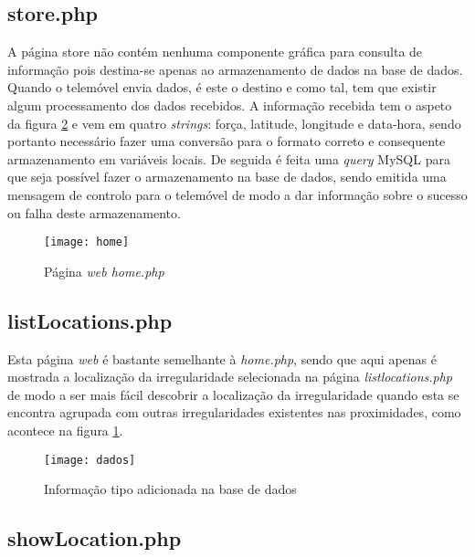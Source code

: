 \subsection{store.php}
\label{sub:store.php}

A página store não contém nenhuma componente gráfica para consulta de informação pois destina-se apenas ao armazenamento de dados na base de dados.
Quando o telemóvel envia dados, é este o destino e como tal, tem que existir algum processamento dos dados recebidos.
A informação recebida tem o aspeto da figura \ref{fig:informacao_tipo_adicionada_na_base_de_dados} e vem em quatro \emph{strings}: força, latitude, longitude e data-hora, sendo portanto necessário fazer uma conversão para o formato correto e consequente armazenamento em variáveis locais.
De seguida é feita uma \emph{query} MySQL para que seja possível fazer o armazenamento na base de dados, sendo emitida uma mensagem de controlo para o telemóvel de modo a dar informação sobre o sucesso ou falha deste armazenamento.

\begin{figure}[htp]
	\centering
	\texttt{[image: home]}
	\caption{Página \emph{web home.php}}
	\label{fig:home.php}
\end{figure}

\subsection{listLocations.php}
\label{sub:listlocations.php}

Esta página \emph{web} é bastante semelhante à \emph{home.php}, sendo que aqui apenas é mostrada a localização da irregularidade selecionada na página \emph{listlocations.php} de modo a ser mais fácil descobrir a localização da irregularidade quando esta se encontra agrupada com outras irregularidades existentes nas proximidades, como acontece na figura \ref{fig:home.php}.

\begin{figure}[htbp]
	\centering
	\texttt{[image: dados]}
	\caption{Informação tipo adicionada na base de dados}
	\label{fig:informacao_tipo_adicionada_na_base_de_dados}
\end{figure}

\subsection{showLocation.php}
\label{sub:showLocation.php}

